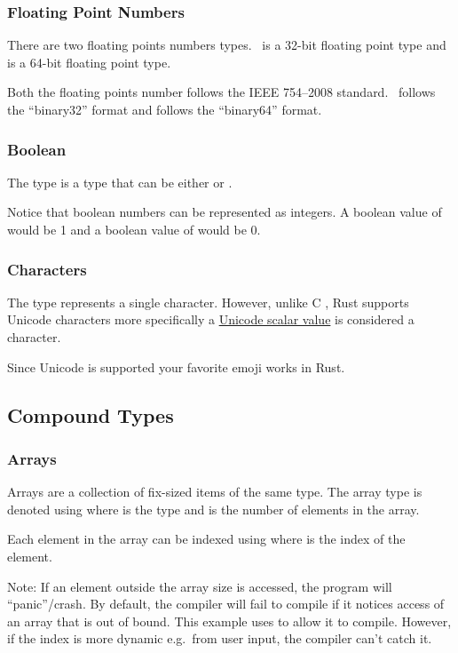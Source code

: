 \documentclass{beamer}
\begin{document}
\begin{frame}
  \frametitle{Floating Point Numbers}
  There are two floating points numbers types.\  is a 32-bit floating point type and  is a 64-bit floating point type.

  Both the floating points number follows the IEEE 754--2008 standard.\  follows the ``binary32'' format and  follows the ``binary64'' format.
  
\end{frame}

\begin{frame}
  \frametitle{Boolean}
  The  type is a type that can be either  or .
  
  \alert{Notice} that boolean numbers can be represented as integers. A boolean value of  would be 1 and a boolean value of  would be 0.
\end{frame}

\begin{frame}
  \frametitle{Characters}
  The  type represents a single character. However, unlike C , Rust  supports Unicode characters more specifically a \href{https://www.unicode.org/glossary/\#unicode_scalar_value}{Unicode scalar value} is considered a character.

  Since Unicode is supported your favorite emoji works in Rust.
  
\end{frame}

\subsection{Compound Types}
\begin{frame}[allowframebreaks]
  \frametitle{Arrays}
  Arrays are a collection of fix-sized items of the same type. The array type is denoted using \inlinecode{[T;\@ N]} where  is the type and  is the number of elements in the array.
  

  Each element in the array can be indexed using \inlinecode{[i]} where  is the index of the element.
  

  \alert{Note:} If an element outside the array size is accessed, the program will ``panic''/crash. By default, the compiler will fail to compile if it notices access of an array that is out of bound. This example uses  to allow it to compile. However, if the index is more dynamic e.g.\ from user input, the compiler can't catch it.
  
\end{frame}
\end{document}
